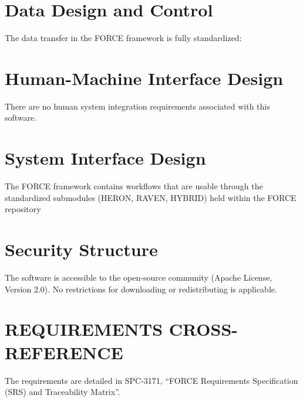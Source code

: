 \section{Data Design and Control}
The data transfer in the FORCE framework is fully standardized:

\section{Human-Machine Interface Design} 
 There are no human system integration requirements associated with this software.
 \section{System Interface Design} 
The FORCE framework contains workflows that are usable through the standardized submodules (HERON, RAVEN, HYBRID) held within the FORCE repository


 \section{Security Structure} 
The software is accessible to the open-source community (Apache License, Version 2.0). No restrictions for downloading or redistributing is applicable.

 \section{REQUIREMENTS CROSS-REFERENCE} 
The requirements are detailed in SPC-3171, ``FORCE Requirements Specification (SRS) and Traceability Matrix''.
